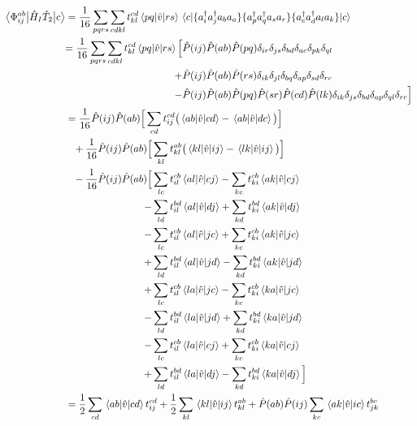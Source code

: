 \begin{align}
    \mel{\phiijab}{\hat{H}_I\hatTt}{c}&=\frac{1}{16}\sum_{pqrs}\sum_{cdkl}t_{kl}^{cd}\brak{pq}{rs}\mel{c}{\{\ad_i\ad_ja_ba_a\}\{\ad_p\ad_qa_sa_r\}\{\ad_c\ad_da_la_k\}}{c}\\
    &
    \begin{aligned}
    =\frac{1}{16}\sum_{pqrs}\sum_{cdkl}t_{kl}^{cd}\brak{pq}{rs}\Big[&\Phat{ij}\Phat{ab}\Phat{pq}\del{ir}\del{js}\del{bd}\del{ac}\del{pk}\del{ql}\\
    +&\Phat{ij}\Phat{ab}\Phat{rs}\del{ik}\del{jl}\del{bq}\del{ap}\del{sd}\del{rc}\\
    -&\Phat{ij}\Phat{ab}\Phat{pq}\Phat{sr}\Phat{cd}\Phat{lk}\del{ik}\del{js}\del{bd}\del{ap}\del{ql}\del{rc}\Big]
    \end{aligned}\\
    &
    \begin{aligned}
    &=\frac{1}{16}\Phat{ij}\Phat{ab}\Big[\sum_{cd}t_{ij}^{cd}\big(\brak{ab}{cd}-\brak{ab}{dc}\big)\Big]\\
    &\phantom{=}+\frac{1}{16}\Phat{ij}\Phat{ab}\Big[\sum_{kl}t_{kl}^{ab}\big(\brak{kl}{ij}-\brak{lk}{ij}\big)\Big]\\
    &
    \begin{aligned}
    \phantom{=}-\frac{1}{16}\Phat{ij}\Phat{ab}\Big[&\sum_{lc}t_{il}^{cb}\brak{al}{cj}-\sum_{kc}t_{ki}^{cb}\brak{ak}{cj}\\
    -&\sum_{ld}t_{il}^{bd}\brak{al}{dj}+\sum_{kd}t_{ki}^{bd}\brak{ak}{dj}\\
    -&\sum_{lc}t_{il}^{cb}\brak{al}{jc}+\sum_{kc}t_{ki}^{cb}\brak{ak}{jc}\\
    +&\sum_{ld}t_{il}^{bd}\brak{al}{jd}-\sum_{kd}t_{ki}^{bd}\brak{ak}{jd}\\
    +&\sum_{lc}t_{il}^{cb}\brak{la}{jc}-\sum_{kc}t_{ki}^{cb}\brak{ka}{jc}\\
    -&\sum_{ld}t_{il}^{bd}\brak{la}{jd}+\sum_{kd}t_{ki}^{bd}\brak{ka}{jd}\\
    -&\sum_{lc}t_{il}^{cb}\brak{la}{cj}+\sum_{kc}t_{ki}^{cb}\brak{ka}{cj}\\
    +&\sum_{ld}t_{il}^{bd}\brak{la}{dj}-\sum_{kd}t_{ki}^{bd}\brak{ka}{dj}\Big]
    \end{aligned}
    \end{aligned}\\
    &=\frac{1}{2}\sum_{cd}\brak{ab}{cd}t_{ij}^{cd}+\frac{1}{2}\sum_{kl}\brak{kl}{ij}t_{kl}^{ab}+\Phat{ab}\Phat{ij}\sum_{kc}\brak{ak}{ic}t_{jk}^{bc}
\end{align}

